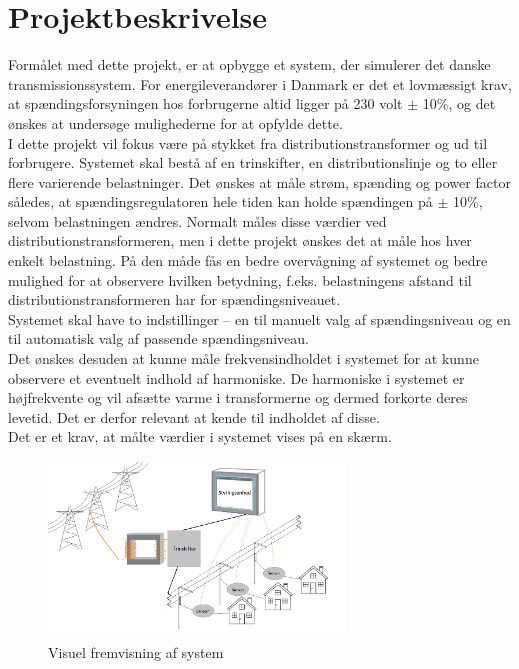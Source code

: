 
\chapter{Projektbeskrivelse}

Formålet med dette projekt, er at opbygge et system, der simulerer det danske transmissionssystem. For energileverandører i Danmark er det et lovmæssigt krav, at spændingsforsyningen hos forbrugerne altid ligger på 230 volt $\pm$ 10$\%$, og det ønskes at undersøge mulighederne for at opfylde dette.\\ 
I dette projekt vil fokus være på stykket fra distributionstransformer og ud til forbrugere. Systemet skal bestå af en trinskifter, en distributionslinje og to eller flere varierende belastninger. Det ønskes at måle strøm, spænding og power factor således, at spændingsregulatoren hele tiden kan holde spændingen på $\pm$ 10$\%$, selvom belastningen ændres. Normalt måles disse værdier ved distributionstransformeren, men i dette projekt ønskes det at måle hos hver enkelt belastning. På den måde fås en bedre overvågning af systemet og bedre mulighed for at observere hvilken betydning, f.eks. belastningens afstand til distributionstransformeren har for spændingsniveauet.\\ Systemet skal have to indstillinger – en til manuelt valg af spændingsniveau og en til automatisk valg af passende spændingsniveau.\\ 
Det ønskes desuden at kunne måle frekvensindholdet i systemet for at kunne observere et eventuelt indhold af harmoniske. De harmoniske i systemet er højfrekvente og vil afsætte varme i transformerne og dermed forkorte deres levetid. Det er derfor relevant at kende til indholdet af disse.\\ 
Det er et krav, at målte værdier i systemet vises på en skærm. 

\begin{figure}[htbp] %
	\centering
	\includegraphics[width=0.7\textwidth]{Figure/RigtBillede}
	\caption{Visuel fremvisning af system}
	\label{fig:Rigtbillede}
\end{figure}